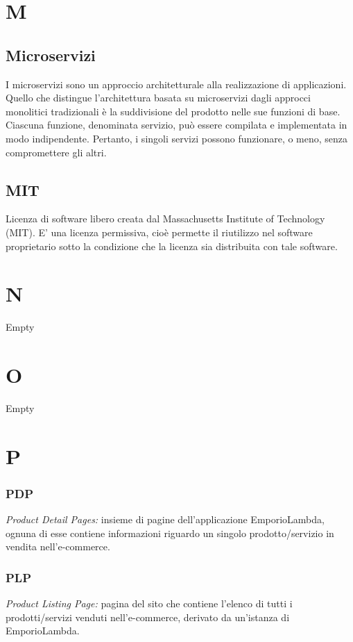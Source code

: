 \section*{M}
\subsection*{Microservizi}
I microservizi sono un approccio architetturale alla realizzazione di applicazioni. 
Quello che distingue l'architettura basata su microservizi dagli approcci monolitici tradizionali 
è la suddivisione del prodotto nelle sue funzioni di base. Ciascuna funzione, denominata servizio, può essere 
compilata e implementata in modo indipendente. Pertanto, i singoli servizi possono funzionare, o meno, senza compromettere gli altri.

\subsection*{MIT}
Licenza di software libero creata dal Massachusetts Institute of Technology (MIT).
E' una licenza permissiva, cioè permette il riutilizzo nel software proprietario sotto la condizione che la licenza sia distribuita con tale software.

\section*{N}
Empty

\section*{O}
Empty

\section*{P}
\subsubsection*{PDP}
\textit{Product Detail Pages:} insieme di pagine dell'applicazione EmporioLambda, ognuna di esse contiene informazioni
riguardo un singolo prodotto/servizio in vendita nell'e-commerce.

\subsubsection*{PLP}
\textit{Product Listing Page:} pagina del sito che contiene l'elenco di tutti i prodotti/servizi venduti
nell'e-commerce, derivato da un'istanza di EmporioLambda.

